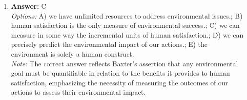 \documentclass[12pt]{article}
\begin{document}
\begin{enumerate}[label=\arabic*.]
\item \textbf{Answer:} C
\\ \textit{Options:} A) we have unlimited resources to address environmental issues.; B) human satisfaction is the only measure of environmental success.; C) we can measure in some way the incremental units of human satisfaction.; D) we can precisely predict the environmental impact of our actions.; E) the environment is solely a human construct.
\\ \textit{Note:} The correct answer reflects Baxter's assertion that any environmental goal must be quantifiable in relation to the benefits it provides to human satisfaction, emphasizing the necessity of measuring the outcomes of our actions to assess their environmental impact.
\end{enumerate}
\end{document}
